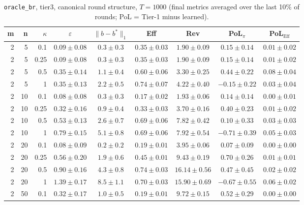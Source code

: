 \begin{table}[htbp]
\centering
\scriptsize
\caption{\texttt{oracle\_br}, tier3, canonical round structure, $T=1000$ (final metrics averaged over the last 10\% of rounds; PoL = Tier-1 minus learned).}
\label{tab:tier3_oracle_br_canonical}
\begin{tabular}{@{}rrrcccccc@{}}
\toprule
m & n & $\kappa$ & $\varepsilon$ & $\|b-b^*\|_1$ & Eff & Rev & PoL$_\pi$ & PoL$_\mathrm{Eff}$ \\
\midrule
2 & 5 & 0.1 & $0.09 \pm 0.08$ & $0.3 \pm 0.3$ & $0.35 \pm 0.03$ & $1.90 \pm 0.09$ & $0.15 \pm 0.14$ & $0.01 \pm 0.02$ \\
2 & 5 & 0.25 & $0.09 \pm 0.08$ & $0.3 \pm 0.3$ & $0.35 \pm 0.03$ & $1.90 \pm 0.09$ & $0.15 \pm 0.14$ & $0.01 \pm 0.02$ \\
2 & 5 & 0.5 & $0.35 \pm 0.14$ & $1.1 \pm 0.4$ & $0.60 \pm 0.06$ & $3.30 \pm 0.25$ & $0.44 \pm 0.22$ & $0.08 \pm 0.04$ \\
2 & 5 & 1 & $0.35 \pm 0.13$ & $2.2 \pm 0.5$ & $0.74 \pm 0.07$ & $4.22 \pm 0.40$ & $-0.15 \pm 0.22$ & $0.03 \pm 0.04$ \\
2 & 10 & 0.1 & $0.08 \pm 0.08$ & $0.3 \pm 0.3$ & $0.17 \pm 0.02$ & $1.93 \pm 0.06$ & $0.14 \pm 0.14$ & $0.00 \pm 0.01$ \\
2 & 10 & 0.25 & $0.32 \pm 0.16$ & $0.9 \pm 0.4$ & $0.33 \pm 0.03$ & $3.70 \pm 0.16$ & $0.40 \pm 0.23$ & $0.01 \pm 0.02$ \\
2 & 10 & 0.5 & $0.53 \pm 0.13$ & $2.6 \pm 0.7$ & $0.69 \pm 0.06$ & $7.82 \pm 0.42$ & $0.10 \pm 0.33$ & $0.03 \pm 0.03$ \\
2 & 10 & 1 & $0.79 \pm 0.15$ & $5.1 \pm 0.8$ & $0.69 \pm 0.06$ & $7.92 \pm 0.54$ & $-0.71 \pm 0.39$ & $0.05 \pm 0.03$ \\
2 & 20 & 0.1 & $0.08 \pm 0.09$ & $0.2 \pm 0.2$ & $0.19 \pm 0.01$ & $3.95 \pm 0.06$ & $0.07 \pm 0.09$ & $0.00 \pm 0.00$ \\
2 & 20 & 0.25 & $0.56 \pm 0.20$ & $1.9 \pm 0.6$ & $0.45 \pm 0.01$ & $9.43 \pm 0.19$ & $0.70 \pm 0.26$ & $0.01 \pm 0.01$ \\
2 & 20 & 0.5 & $0.90 \pm 0.16$ & $4.3 \pm 0.8$ & $0.74 \pm 0.03$ & $16.14 \pm 0.56$ & $0.47 \pm 0.45$ & $0.02 \pm 0.02$ \\
2 & 20 & 1 & $1.39 \pm 0.17$ & $8.5 \pm 1.1$ & $0.70 \pm 0.03$ & $15.90 \pm 0.69$ & $-0.67 \pm 0.55$ & $0.06 \pm 0.02$ \\
2 & 50 & 0.1 & $0.32 \pm 0.17$ & $1.0 \pm 0.5$ & $0.19 \pm 0.01$ & $9.72 \pm 0.15$ & $0.52 \pm 0.29$ & $0.00 \pm 0.00$ \\

\end{tabular}
\end{table}

